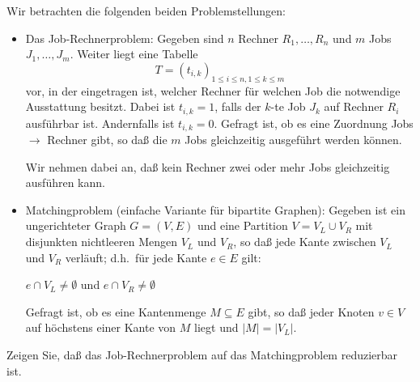\begin{exercise}

Wir betrachten die folgenden beiden Problemstellungen:

\begin{itemize}
\item Das Job-Rechnerproblem:
Gegeben sind $n$ Rechner $R_1,\ldots,R_n$ 
und $m$ Jobs $J_1,\ldots,J_m$.
Weiter liegt eine Tabelle 
$$T = (t_{i,k})_{1 \le i \le n, 1 \le k \le m}
$$ 
vor, in der eingetragen ist, welcher Rechner 
f\"ur welchen Job die notwendige Ausstattung besitzt.
Dabei ist $t_{i,k} = 1$, falls der $k$-te Job $J_k$ auf Rechner $R_i$
ausf\"uhrbar ist. Andernfalls ist $t_{i,k} = 0$.
Gefragt ist, ob es eine Zuordnung
  Jobs $\longrightarrow$ Rechner
gibt, so da{\ss} die $m$ Jobs gleichzeitig ausgef\"uhrt werden
k\"onnen.

Wir nehmen dabei an, da{\ss} kein Rechner zwei oder mehr Jobs
gleichzeitig ausf\"uhren kann.

\item Matchingproblem (einfache Variante f\"ur bipartite Graphen):
Gegeben ist ein ungerichteter Graph $G = (V,E)$ und eine Partition
$V = V_L \cup V_R$ mit disjunkten nichtleeren Mengen $V_L$ und $V_R$,
so da{\ss}  
jede Kante zwischen $V_L$ und $V_R$ verl\"auft; 
d.h.~f\"ur jede Kante $e \in E$ gilt:
\begin{center}
$ e \cap V_L \not= \emptyset$ und
$ e \cap V_R \not= \emptyset$ 
\end{center}
Gefragt ist, ob es eine Kantenmenge $M \subseteq E$ gibt, so da{\ss}
jeder Knoten $v \in V$ auf h\"ochstens einer Kante von $M$ liegt und
$|M| = |V_L|$.
\end{itemize}
Zeigen Sie, da{\ss} das Job-Rechnerproblem auf das 
Matchingproblem
reduzierbar ist.

\end{exercise}
